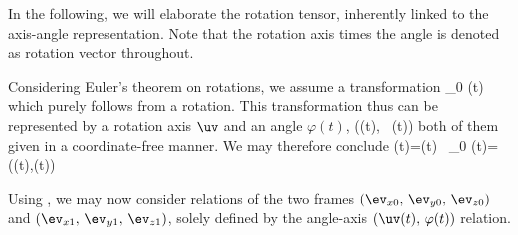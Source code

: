 In the following, we will elaborate the rotation tensor, inherently linked to the axis-angle representation.
Note that the rotation axis times the angle is denoted as rotation vector throughout.

Considering Euler's theorem on rotations, we assume a transformation
\be
  \rv_0 \ra \rv(t)
\ee
which purely follows from a rotation. This transformation thus can be represented by a rotation axis $\uv$ and an angle $\varphi(t)$,
\be
  (\uv(t), \, \varphi(t))
\ee
both of them given in a coordinate-free manner.
We may therefore conclude
\be %
  \rv(t)=\Rot(t) \, \rv_0 \qquad {} \qquad \Rot(t)=\Rot(\uv(t),\varphi(t))
\ee
%
%

Using , we may now consider relations of the two frames $(\ev_{x0},\,\ev_{y0},\,\ev_{z0})$ and $(\ev_{x1},\,\ev_{y1},\,\ev_{z1})$, solely defined by the angle-axis $(\uv(t), \, \varphi(t))$ relation.
%
%

